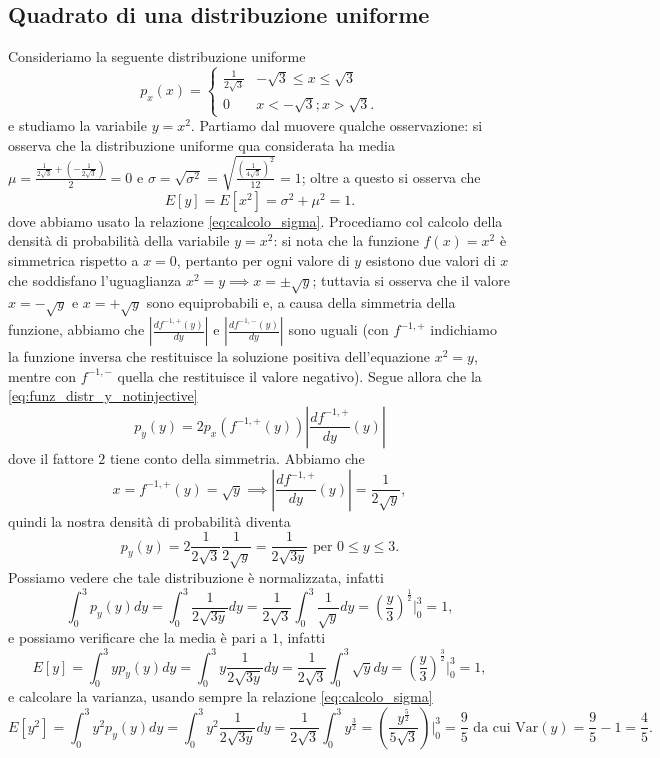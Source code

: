 \documentclass{report}
\begin{document}
\subsection{Quadrato di una distribuzione uniforme}
	Consideriamo la seguente distribuzione uniforme
	$$
		p_x(x) = \begin{cases}
			\frac{1}{2\sqrt{3}} & -\sqrt{3} \leq x \leq \sqrt{3} \\
			0 & x < -\sqrt{3}; x > \sqrt{3}.
		\end{cases}
	$$
	e studiamo la variabile $y = x^2$. Partiamo dal muovere qualche osservazione: si osserva che la distribuzione uniforme qua considerata ha media $\mu = \frac{\frac{1}{2\sqrt{3}} + (-\frac{1}{2\sqrt{3}})}{2} = 0$ e $\sigma = \sqrt{\sigma^2} = \sqrt{\frac{(\frac{1}{4\sqrt{3}})^2}{12}} = 1$; oltre a questo si osserva che
	$$
		E[y] = E[x^2] = \sigma^2 + \mu^2 = 1.
	$$
	dove abbiamo usato la relazione \ref{eq:calcolo_sigma}. Procediamo col calcolo della densità di probabilità della variabile $y = x^2$: si nota che la funzione $f(x) = x^2$ è simmetrica rispetto a $x = 0$, pertanto per ogni valore di $y$ esistono due valori di $x$ che soddisfano l'uguaglianza $x^2 = y \implies x = \pm \sqrt{y}$; tuttavia si osserva che il valore $x = -\sqrt{y}$ e $x = +\sqrt{y}$ sono equiprobabili e, a causa della simmetria della funzione, abbiamo che $\left| \frac{df^{-1, +}(y)}{dy} \right|$ e $\left| \frac{df^{-1, -}(y)}{dy} \right|$ sono uguali (con $f^{-1, +}$ indichiamo la funzione inversa che restituisce la soluzione positiva dell'equazione $x^2 = y$, mentre con $f^{-1, -}$ quella che restituisce il valore negativo). Segue allora che la \ref{eq:funz_distr_y_notinjective} 
	$$
		p_y(y) = 2p_x(f^{-1, +}(y)) \left| \frac{df^{-1, +}}{dy}(y) \right|
	$$
	dove il fattore $2$ tiene conto della simmetria. Abbiamo che
	$$
		x = f^{-1, +}(y) = \sqrt{y} \implies \left| \frac{df^{-1, +}}{dy}(y) \right| = \frac{1}{2\sqrt{y}},
	$$
	quindi la nostra densità di probabilità diventa
	$$
		p_y(y) = 2 \frac{1}{2\sqrt{3}} \frac{1}{2\sqrt{y}} = \frac{1}{2\sqrt{3y}} \text{ per } 0 \leq y \leq 3.
	$$
	Possiamo vedere che tale distribuzione è normalizzata, infatti
	$$
		\int_0^3 p_y(y) dy = \int_0^3 \frac{1}{2\sqrt{3y}}dy = \frac{1}{2\sqrt{3}} \int_0^3 \frac{1}{\sqrt{y}}dy = \left( \frac{y}{3} \right)^{\frac{1}{2}}\bigg|^3_0 = 1,
 	$$
	e possiamo verificare che la media è pari a $1$, infatti
	$$
		E[y] = \int_0^3 y p_y(y) dy = \int_0^3 y \frac{1}{2\sqrt{3y}}dy = \frac{1}{2\sqrt{3}} \int_0^3 \sqrt{y} dy = \left( \frac{y}{3} \right)^{\frac{3}{2}}\bigg|^3_0 = 1,
	$$
	e calcolare la varianza, usando sempre la relazione \ref{eq:calcolo_sigma}
	$$
		E[y^2] = \int_0^3 y^2 p_y(y) dy = \int_0^3 y^2 \frac{1}{2 \sqrt{3y}}dy = \frac{1}{2\sqrt{3}} \int_0^3 y^{\frac{3}{2}} = \left( \frac{y^{\frac{5}{2}}}{5\sqrt{3}} \right)\bigg|^3_0 = \frac{9}{5} \text{ da cui } \text{Var}(y) = \frac{9}{5} - 1 = \frac{4}{5}.
	$$
\end{document}
